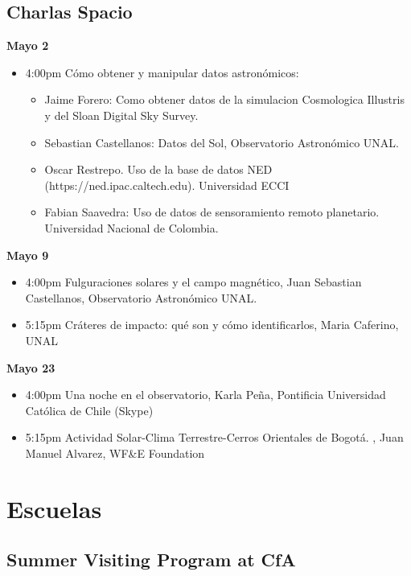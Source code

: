 \documentclass{book}
\begin{document}
 
\subsection{Charlas Spacio}
\textbf{Mayo 2}
\begin{itemize}
    \item 4:00pm Cómo obtener y manipular datos astronómicos:
\begin{itemize}
    \item Jaime Forero: Como obtener datos de la simulacion Cosmologica Illustris y del Sloan Digital Sky Survey.
    \item Sebastian Castellanos: Datos del Sol,  Observatorio Astronómico UNAL.
    \item Oscar Restrepo. Uso de la base de datos NED (https://ned.ipac.caltech.edu). Universidad ECCI
    \item Fabian Saavedra: Uso de datos de sensoramiento remoto planetario. Universidad Nacional de Colombia.
    \end{itemize}
\end{itemize}


\textbf{Mayo 9}
\begin{itemize}
   \item 4:00pm Fulguraciones solares y el campo magnético, Juan Sebastian Castellanos, Observatorio Astronómico UNAL.
   \item 5:15pm Cráteres de impacto: qué son y cómo identificarlos, Maria Caferino, UNAL
\end{itemize}
\textbf{Mayo 23}
\begin{itemize}
   \item 4:00pm Una noche en el observatorio, Karla Peña, Pontificia Universidad Católica de Chile (Skype)
   \item 5:15pm Actividad Solar-Clima Terrestre-Cerros Orientales de Bogotá.
    , Juan Manuel Alvarez, WF\&E Foundation
    \end{itemize}


       \section*{Escuelas}

\subsection{Summer Visiting Program at CfA}
\end{document}

